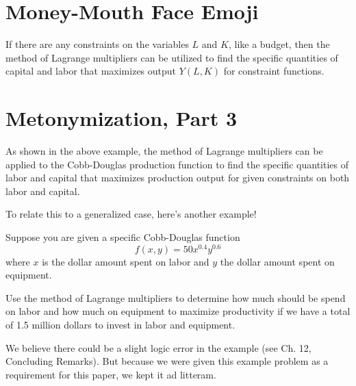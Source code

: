 \chapter{Money-Mouth Face Emoji}
If there are any constraints on the variables $L$ and $K$, like a budget, then the method of Lagrange multipliers can be utilized to find the specific quantities of capital and labor that maximizes output $Y(L, K)$ for constraint functions.
\setcounter{chapter}{10}
\chapter{Metonymization, Part 3}
As shown in the above example, the method of Lagrange multipliers can be applied to the Cobb-Douglas production function to find the specific quantities of labor and capital that maximizes production output for given constraints on both labor and capital.

To relate this to a generalized case, here's another example!
\begin{eg}
	Suppose you are given a specific Cobb-Douglas function \[f(x, y) = 50x^{0.4}y^{0.6}\] where $x$ is the dollar amount spent on labor and $y$ the dollar amount spent on equipment.
	
	Use the method of Lagrange multipliers to determine how much should be spend on labor and how much on equipment to maximize productivity if we have a total of 1.5 million dollars to invest in labor and equipment.
	
	We believe there could be a slight logic error in the example (see Ch. 12, Concluding Remarks). But because we were given this example problem as a requirement for this paper, we kept it ad litteram.
\end{eg}